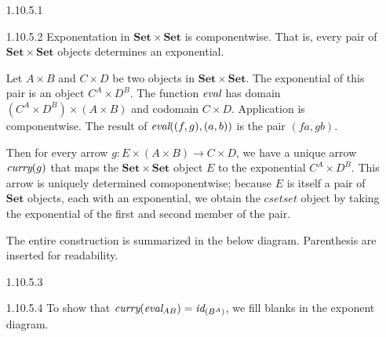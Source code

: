 \documentclass{article}
\newcommand{\curry}[1]{\emph{curry}(#1)}
\newcommand{\eval}{\emph{eval}}
\newcommand{\id}{\emph{id}}
\newcommand{\cset}{\mathbf{Set}}
\newcommand{\csetset}{\cset \times \cset}
\begin{document}
\begin{enumerate}
\item [1.10.5.1]
\item [1.10.5.2]
  Exponentation in $\csetset$ is componentwise.
  That is, every pair of $\csetset$ objects determines an exponential.
  
  Let $A \times B$ and $C \times D$ be two objects in $\csetset$.
  The exponential of this pair is an object $C^A \times D^B$.
  The function $\eval$  has domain $(C^A \times D^B) \times (A \times B)$ and codomain $C \times D$.
  Application is componentwise.
  The result of $\eval((f, g), (a,b))$ is the pair $(f a, g b)$.

  Then for every arrow $g : E \times (A \times B) \rightarrow C \times D$, we have a unique arrow $\curry{g}$ that maps the $\csetset$ object $E$ to the exponential $C^A \times D^B$.
  This arrow is uniquely determined comoponentwise; because $E$ is itself a pair of $\cset$ objects, each with an exponential, we obtain the $csetset$ object by taking the exponential of the first and second member of the pair.
  
  The entire construction is summarized in the below diagram.
  Parenthesis are inserted for readability.
  \begin{center}
  \end{center}

\item [1.10.5.3]
\item [1.10.5.4]
  To show that $\curry{\eval_{AB}} = \id_{(B^A)}$, we fill blanks in the exponent diagram.
  \begin{center}
  \end{center}


\end{enumerate}
\end{document}
